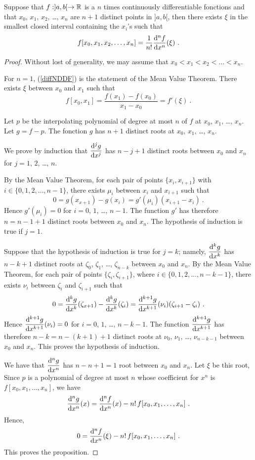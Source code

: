 \begin{prop}
Suppose that $f:]a,b[\rightarrow \mathbb{R}$ is a $n$ times continuously
differentiable fonctions and that $x_0$, $x_1$, $x_2$, \ldots, $x_n$
are $n+1$ distinct points in $]a,b[$, then there exists $\xi$ in the
smallest closed interval containing the $x_i$'s such that
\begin{equation}\label{diffNDDF}
f[x_0,x_1,x_2, \ldots, x_n] = \frac{1}{n!} \dydxn{f}{x}{n}(\xi) \ .
\end{equation}
\label{prop1_NDDF}
\end{prop}

\begin{proof}
Without lost of generality, we may assume that
$x_0 < x_1 < x_2 < \ldots < x_n$.

For $n=1$, (\ref{diffNDDF}) is the statement of the Mean Value
Theorem.  There exists $\xi$ between $x_0$ and $x_1$ such that
\[
f[x_0,x_1] = \frac{f(x_1)-f(x_0)}{x_1-x_0} = f'(\xi) \ .
\]

Let $p$ be the interpolating polynomial of degree at most $n$ of $f$
at $x_0$, $x_1$, \ldots, $x_n$.  Let $g = f - p$.  The fonction $g$
has $n+1$ distinct roots at $x_0$, $x_1$, \ldots, $x_n$.

We prove by induction that $\displaystyle \frac{\mathrm{d}^{j}{g}}{\mathrm{d}{x}^{j}}$
has $n-j+1$ distinct roots between $x_0$ and $x_n$ for $j=1$, $2$,
\ldots, $n$.

By the Mean Value Theorem, for each pair of points
$\{ x_i, x_{i+1}\}$ with $i\in\{0,1,2,\ldots,n-1\}$, there exists
$\mu_i$ between $x_i$ and $x_{i+1}$ such that
\[
0 = g(x_{x+1}) - g(x_i) = g'(\mu_i)(x_{i+1}-x_i) \ .
\]
Hence $g'(\mu_i)=0$ for $i=0$, $1$, \ldots, $n-1$.  The function $g'$
has therefore $n = n-1+1$ distinct roots between $x_0$ and $x_n$.  The
hypothesis of induction is true if $j=1$.

Suppose that the hypothesis of induction is true for $j=k$; namely,
$\displaystyle \frac{\mathrm{d}^{k}{g}}{\mathrm{d}{x}^{k}}$ has $n-k+1$ distinct roots
at $\zeta_0$, $\zeta_1$, \ldots, $\zeta_{n-k}$ between $x_0$ and $x_n$.
By the Mean Value Theorem, for each pair of points
$\{ \zeta_i, \zeta_{i+1}\}$, where $i\in\{0,1,2,\ldots,n-k-1\}$, there
exists $\nu_i$ between $\zeta_i$ and $\zeta_{i+1}$ such that
\[
0 = \frac{\mathrm{d}^{k}{g}}{\mathrm{d}{x}^{k}}(\zeta_{x+1}) - \frac{\mathrm{d}^{k}{g}}{\mathrm{d}{x}^{k}}(\zeta_i)
= \frac{\mathrm{d}^{k+1}{g}}{\mathrm{d}{x}^{k+1}}(\nu_i)(\zeta_{i+1}-\zeta_i) \ .
\]
Hence $\displaystyle \frac{\mathrm{d}^{k+1}{g}}{\mathrm{d}{x}^{k+1}}(\nu_i)=0$ for $i=0$, $1$,
\ldots, $n-k-1$.  The function $\displaystyle \frac{\mathrm{d}^{k+1}{g}}{\mathrm{d}{x}^{k+1}}$ has
therefore $n-k = n-(k+1)+1$ distinct roots at $\nu_0$, $\nu_1$,
\ldots, $\nu_{n-k-1}$ between $x_0$ and $x_n$.  This proves the
hypothesis of induction.

We have that $\displaystyle \frac{\mathrm{d}^{n}{g}}{\mathrm{d}{x}^{n}}$
has $n-n+1 = 1$ root between $x_0$ and $x_n$.  Let $\xi$ be this root,
Since $p$ is a polynomial of degree at most $n$ whose coefficient for
$x^n$ is $f[x_0,x_1,\ldots, x_n]$, we have
\[
\frac{\mathrm{d}^{n}{g}}{\mathrm{d}{x}^{n}}(x) = \frac{\mathrm{d}^{n}{f}}{\mathrm{d}{x}^{n}}(x) - n!\,f[x_0,x_1,\ldots,x_n] \ .
\]
Hence,
\[
0 = \frac{\mathrm{d}^{n}{f}}{\mathrm{d}{x}^{n}}(\xi) - n!\,f[x_0,x_1,\ldots,x_n] \ .
\]
This proves the proposition.
\end{proof}

